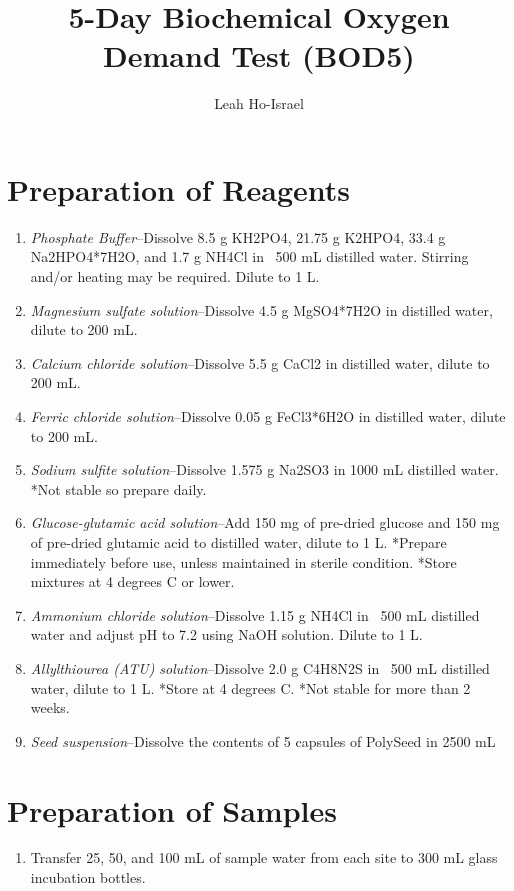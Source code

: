 \documentclass{article}
\title{5-Day Biochemical Oxygen Demand Test (BOD5)}
\author{Leah Ho-Israel}
\begin{document}


\maketitle

\section*{Preparation of Reagents}
\begin{enumerate}
  \item \emph{Phosphate Buffer}--Dissolve 8.5 g KH2PO4, 21.75 g K2HPO4, 33.4 g Na2HPO4*7H2O, and 1.7 g NH4Cl in ~500 mL distilled water. Stirring and/or heating may be required. Dilute to 1 L.
  
  \item \emph{Magnesium sulfate solution}--Dissolve 4.5 g MgSO4*7H2O in distilled water, dilute to 200 mL. 
  
  \item \emph{Calcium chloride solution}--Dissolve 5.5 g CaCl2 in distilled water, dilute to 200 mL.
  
  \item \emph{Ferric chloride solution}--Dissolve 0.05 g FeCl3*6H2O in distilled water, dilute to 200 mL. 
  \item \emph{Sodium sulfite solution}--Dissolve 1.575 g Na2SO3 in 1000 mL distilled water. 
\subitem **Not stable so prepare daily.
  \item \emph{Glucose-glutamic acid solution}--Add 150 mg of pre-dried glucose and 150 mg of pre-dried glutamic acid to distilled water, dilute to 1 L. 
  \subitem **Prepare immediately before use, unless maintained in sterile condition.
  \subitem **Store mixtures at 4 degrees C or lower. 
  \item \emph{Ammonium chloride solution}--Dissolve 1.15 g NH4Cl in ~500 mL distilled water and adjust pH to 7.2 using NaOH solution. Dilute to 1 L. 
  \item \emph{Allylthiourea (ATU) solution}--Dissolve 2.0 g C4H8N2S in ~500 mL distilled water, dilute to 1 L. 
  \subitem **Store at 4 degrees C.
  \subitem **Not stable for more than 2 weeks. 
  \item \emph{Seed suspension}--Dissolve the contents of 5 capsules of PolySeed in 2500 mL 
\end{enumerate}

\section*{Preparation of Samples}
\begin{enumerate}
  \item Transfer 25, 50, and 100 mL of sample water from each site to 300 mL glass incubation bottles. 
\end{enumerate}
\end{document}
